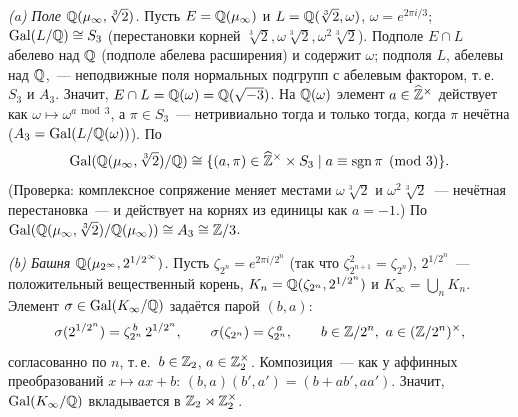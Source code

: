 \begin{example}[7.36]
\emph{(a) Поле $\mathbb Q(\mu_\infty,\sqrt[3]2)$.} Пусть $E=\mathbb Q(\mu_\infty)$ и $L=\mathbb Q(\sqrt[3]2,\omega)$, $\omega=e^{2\pi i/3}$;
$\operatorname{Gal}(L/\mathbb Q)\cong S_3$ (перестановки корней $\sqrt[3]2,\omega\sqrt[3]2,\omega^2\sqrt[3]2$). Подполе $E\cap L$ абелево над
$\mathbb Q$ (подполе абелева расширения) и содержит $\omega$; подполя $L$, абелевы над $\mathbb Q$,~--- неподвижные поля нормальных
подгрупп с абелевым фактором, т.\,е.\ $S_3$ и $A_3$. Значит, $E\cap L=\mathbb Q(\omega)=\mathbb Q(\sqrt{-3})$. На $\mathbb Q(\omega)$ элемент
$a\in\widehat{\mathbb Z}^\times$ действует как $\omega\mapsto\omega^{a\bmod3}$, а $\pi\in S_3$~--- нетривиально тогда и только тогда, когда
$\pi$ нечётна ($A_3=\operatorname{Gal}(L/\mathbb Q(\omega))$). По 
\[
\operatorname{Gal}(\mathbb Q(\mu_\infty,\sqrt[3]2)/\mathbb Q)\cong\{(a,\pi)\in\widehat{\mathbb Z}^\times\times S_3\mid a\equiv\operatorname{sgn}\pi\pmod3\}.
\]
(Проверка: комплексное сопряжение меняет местами $\omega\sqrt[3]2$ и $\omega^2\sqrt[3]2$~--- нечётная перестановка~--- и
действует на корнях из единицы как $a=-1$.) По  $\operatorname{Gal}(\mathbb Q(\mu_\infty,\sqrt[3]2)/\mathbb Q(\mu_\infty))\cong A_3\cong\mathbb Z/3$.

\begin{center}
\end{center}

\emph{(b) Башня $\mathbb Q(\mu_{2^\infty},2^{1/2^\infty})$.} Пусть $\zeta_{2^n}=e^{2\pi i/2^n}$ (так что
$\zeta_{2^{n+1}}^2=\zeta_{2^n}$), $2^{1/2^n}$~--- положительный вещественный корень, $K_n=\mathbb Q(\zeta_{2^n},2^{1/2^n})$ и
$K_\infty=\bigcup_nK_n$. Элемент $\sigma\in\operatorname{Gal}(K_\infty/\mathbb Q)$ задаётся парой $(b,a)$:
\[
\sigma(2^{1/2^n})=\zeta_{2^n}^{\,b}\,2^{1/2^n},\qquad\sigma(\zeta_{2^n})=\zeta_{2^n}^{\,a},
\qquad b\in\mathbb Z/2^n,\ a\in(\mathbb Z/2^n)^\times,
\]
согласованно по $n$, т.\,е.\ $b\in\mathbb Z_2$, $a\in\mathbb Z_2^\times$. Композиция~--- как у аффинных преобразований $x\mapsto ax+b$:
$(b,a)(b',a')=(b+ab',aa')$. Значит, $\operatorname{Gal}(K_\infty/\mathbb Q)$ вкладывается в $\mathbb Z_2\rtimes\mathbb Z_2^\times$.


\end{example}
